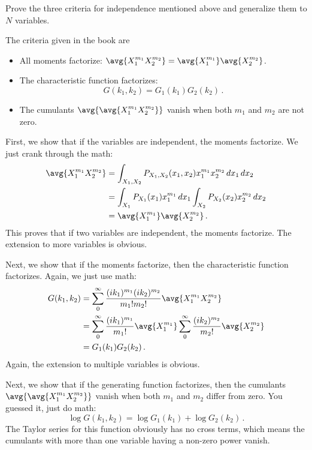 

Prove the three criteria for independence mentioned above and generalize them to $N$ variables.

The criteria given in the book are
\begin{itemize}
  \item All moments factorize: $\avg{X_1^{m_1} X_2^{m_2}} = \avg{X_1^{m_1}} \avg{X_2^{m_2}}$.
  \item The characteristic function factorizes:
    \begin{equation*}
      G(k_1, k_2) = G_1(k_1)G_2(k_2) \, .
    \end{equation*}
  \item The cumulants $\avg{\avg{X_1^{m_1} X_2^{m_2}}}$ vanish when both $m_1$ and $m_2$ are not zero.
\end{itemize}


First, we show that if the variables are independent, the moments factorize.
We just crank through the math:
\begin{align*}
  \avg{X_1^{m_1} X_2^{m_2}}
  &= \int_{X_1,X_2} P_{X_1, X_2}(x_1, x_2) x_1^{m_1} x_2^{m_2} \, dx_1 \, dx_2 \\
  &= \int_{X_1} P_{X_1}(x_1) x_1^{m_1} \, dx_1 \int_{X_2} P_{X_2}(x_2) x_2^{m_2} \, dx_2 \\
  &= \avg{X_1^{m_1}} \avg{X_2^{m_2}} \, .
\end{align*}
This proves that if two variables are independent, the moments factorize.
The extension to more variables is obvious.

Next, we show that if the moments factorize, then the characteristic function factorizes.
Again, we just use math:
\begin{align*}
  G(k_1, k_2)
  &= \sum_0^{\infty} \frac{(ik_1)^{m_1} (ik_2)^{m_2}}{m_1! m_2!} \avg{X_1^{m_1} X_2^{m_2}} \\
  &=
    \sum_0^{\infty} \frac{(ik_1)^{m_1}}{m_1!} \avg{X_1^{m_1}}
    \sum_0^{\infty} \frac{(ik_2)^{m_2}}{m_2!} \avg{X_2^{m_2}} \\
  &= G_1(k_1) G_2(k_2) \, .
\end{align*}
Again, the extension to multiple variables is obvious.

Next, we show that if the generating function factorizes, then the cumulants $\avg{\avg{X_1^{m_1} X_2^{m_2}}}$ vanish when both $m_1$ and $m_2$ differ from zero.
You guessed it, just do math:
\begin{equation*}
  \log G(k_1, k_2)
  = \log G_1(k_1) + \log G_2(k_2) \, .
\end{equation*}
The Taylor series for this function obviously has no cross terms, which means the cumulants with more than one variable having a non-zero power vanish.

